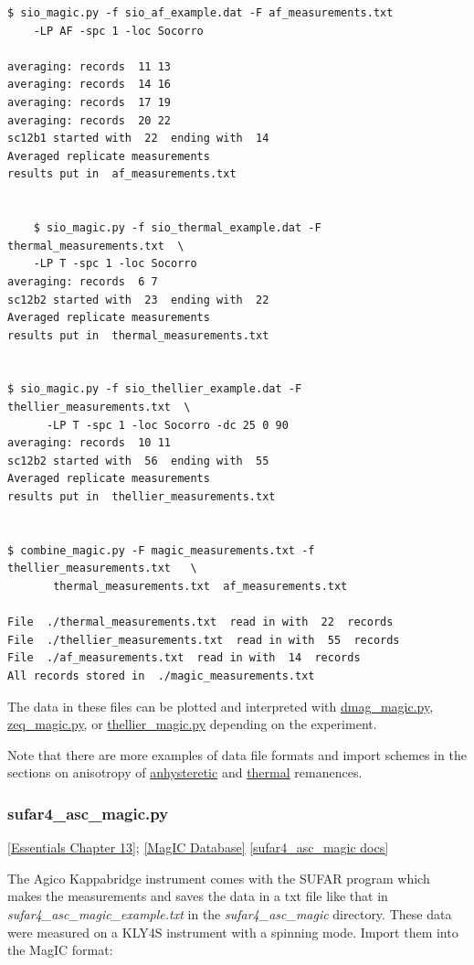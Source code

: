 \documentclass[11pt]{book}
\begin{document}
{{{{\begin{verbatim}
$ sio_magic.py -f sio_af_example.dat -F af_measurements.txt
    -LP AF -spc 1 -loc Socorro

averaging: records  11 13
averaging: records  14 16
averaging: records  17 19
averaging: records  20 22
sc12b1 started with  22  ending with  14
Averaged replicate measurements
results put in  af_measurements.txt


    $ sio_magic.py -f sio_thermal_example.dat -F thermal_measurements.txt  \
    -LP T -spc 1 -loc Socorro
averaging: records  6 7
sc12b2 started with  23  ending with  22
Averaged replicate measurements
results put in  thermal_measurements.txt


$ sio_magic.py -f sio_thellier_example.dat -F  thellier_measurements.txt  \
      -LP T -spc 1 -loc Socorro -dc 25 0 90
averaging: records  10 11
sc12b2 started with  56  ending with  55
Averaged replicate measurements
results put in  thellier_measurements.txt


$ combine_magic.py -F magic_measurements.txt -f  thellier_measurements.txt   \
       thermal_measurements.txt  af_measurements.txt

File  ./thermal_measurements.txt  read in with  22  records
File  ./thellier_measurements.txt  read in with  55  records
File  ./af_measurements.txt  read in with  14  records
All records stored in  ./magic_measurements.txt

 \end{verbatim}

The data in these files can be plotted and interpreted with \href{#dmag_magic.py}{dmag\_magic.py}, \href{#zeq_magic.py}{zeq\_magic.py}, or \href{#thellier_magic.py}{ thellier\_magic.py}  depending on the experiment.

Note that there are more examples of data file formats and import schemes in the sections on anisotropy of \href{#aarm_magic.py}{anhysteretic}  and \href{#atrm_magic.py}{thermal} remanences.


\subsubsection{sufar4\_asc\_magic.py}
\href{http://earthref.org/MAGIC/books/Tauxe/Essentials/WebBook3ch13.html#ch13}{[Essentials Chapter 13]};
\href{#MagICDatabase}{[MagIC Database]}
\href{https://github.com/PmagPy/PmagPy/blob/master/programs/sufar4_asc_magic.py}{[sufar4\_asc\_magic docs]}


The Agico Kappabridge instrument comes with the SUFAR program which makes the measurements and saves the data in a txt file like that in {\it sufar4\_asc\_magic\_example.txt} in the {\it sufar4\_asc\_magic} directory.  These data were measured on a KLY4S instrument with a spinning mode.    Import them into the MagIC format:

}}}}
\end{document}
